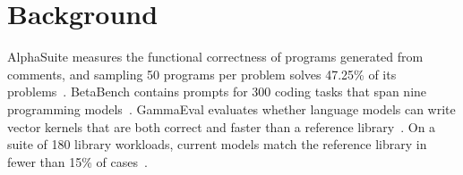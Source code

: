 \section{Background}

AlphaSuite measures the functional correctness of programs generated from comments, and sampling 50 programs per problem solves 47.25\% of its problems~\cite{Alpha2021}.
BetaBench contains prompts for 300 coding tasks that span nine programming models~\cite{Beta2024}.
GammaEval evaluates whether language models can write vector kernels that are both correct and faster than a reference library~\cite{Gamma2025}.
On a suite of 180 library workloads, current models match the reference library in fewer than 15\% of cases~\cite{Beta2024}.
